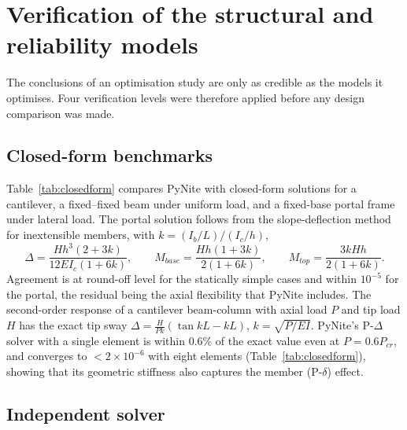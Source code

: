 \section{Verification of the structural and reliability models}\label{sec:verification}

The conclusions of an optimisation study are only as credible as the models it optimises.
Four verification levels were therefore applied before any design comparison was made.

\subsection{Closed-form benchmarks}\label{sec:closedform}

Table~\ref{tab:closedform} compares PyNite with closed-form solutions for a cantilever, a
fixed--fixed beam under uniform load, and a fixed-base portal frame under lateral load. The
portal solution follows from the slope-deflection method for inextensible members, with
$k = (I_b/L)/(I_c/h)$,
\begin{equation}
\Delta = \frac{Hh^3(2+3k)}{12EI_c(1+6k)},\qquad
M_{base} = \frac{Hh(1+3k)}{2(1+6k)},\qquad
M_{top} = \frac{3kHh}{2(1+6k)}.
\end{equation}
Agreement is at round-off level for the statically simple cases and within $10^{-5}$ for the
portal, the residual being the axial flexibility that PyNite includes. The second-order
response of a cantilever beam-column with axial load $P$ and tip load $H$ has the exact tip
sway $\Delta = \frac{H}{Pk}(\tan kL - kL)$, $k=\sqrt{P/EI}$. PyNite's P-$\Delta$ solver with
a single element is within 0.6\% of the exact value even at $P = 0.6P_{cr}$, and converges to
$<2\times10^{-6}$ with eight elements (Table~\ref{tab:closedform}), showing that its geometric
stiffness also captures the member (P-$\delta$) effect.

\begin{table}[!htbp]
\centering
\caption{PyNite versus closed-form solutions ($E = 200$~GPa).}
\label{tab:closedform}
\small
\fittable{}
\end{table}

\subsection{Independent solver}\label{sec:opensees}

